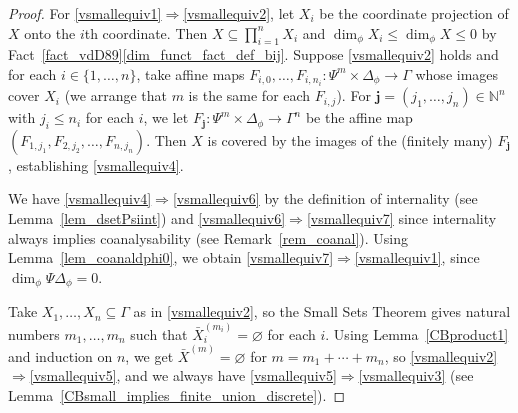 \documentclass[11pt]{amsart}
\theoremstyle{plain}
\theoremstyle{definition}
\numberwithin{equation}{section}
\newcommand\N{\mathbb{N}}
\newcommand\0{\varnothing}
\begin{document}
\begin{proof}
For \eqref{vsmallequiv1}$\Rightarrow$\eqref{vsmallequiv2}, let $X_i$ be the coordinate projection of $X$ onto the $i$th coordinate. Then $X \subseteq \prod_{i=1}^n X_i$ and $\dim_\phi X_i \leq \dim_\phi X \leq 0$ by Fact~\ref{fact_vdD89}\eqref{dim_funct_fact_def_bij}.
Suppose \eqref{vsmallequiv2} holds and for each $i \in \{1,\ldots,n\}$, take affine maps $F_{i,0},\ldots,F_{i,n_i} \colon \Psi^{m}\times\Delta_{\phi}\to\Gamma$ whose images cover $X_i$ (we arrange that $m$ is the same for each $F_{i,j}$). For $\bm{j} = (j_1,\ldots,j_n)\in \N^n$ with $j_i\leq n_i$ for each $i$, we let $F_{\bm{j}}\colon \Psi^{m}\times\Delta_{\phi}\to\Gamma^n$ be the affine map $(F_{1,j_1},F_{2,j_2},\ldots,F_{n,j_n})$. Then $X$ is covered by the images of the (finitely many) $F_{\bm{j}}$, establishing \eqref{vsmallequiv4}.

We have \eqref{vsmallequiv4}$\Rightarrow$\eqref{vsmallequiv6} by the  definition of internality (see Lemma~\ref{lem_dsetPsiint}) 
and \eqref{vsmallequiv6}$\Rightarrow$\eqref{vsmallequiv7} since internality always implies coanalysability (see Remark~\ref{rem_coanal}). Using Lemma~\ref{lem_coanaldphi0}, we obtain \eqref{vsmallequiv7}$\Rightarrow$\eqref{vsmallequiv1}, since  $\dim_{\phi}\Psi\Delta_{\phi}=0$. 

Take $X_1,\ldots,X_n \subseteq \Gamma$ as in \eqref{vsmallequiv2}, so the Small Sets Theorem gives natural numbers $m_1,\ldots,m_n$ such that $\bar{X}_i^{(m_i)} = \varnothing$ for each $i$. Using Lemma~\ref{CBproduct1} and induction on $n$, we get $\bar{X}^{(m)} = \varnothing$ for $m = m_1+\cdots+m_n$, so \eqref{vsmallequiv2}$\Rightarrow$\eqref{vsmallequiv5}, and we always have \eqref{vsmallequiv5}$\Rightarrow$\eqref{vsmallequiv3} (see Lemma~\ref{CBsmall_implies_finite_union_discrete}). 


\end{proof}
\end{document}
